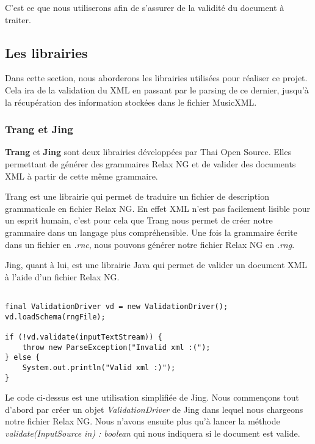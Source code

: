 \par
C'est ce que nous utiliserons afin de s'assurer de la validité du document à traiter.


\subsection{Les librairies}

Dans cette section, nous aborderons les librairies utilisées pour réaliser ce projet. Cela ira de la validation du XML en passant par le parsing de ce dernier, jusqu'à la récupération des information stockées dans le fichier MusicXML.


\subsubsection{Trang et Jing}

\textbf{Trang} \cite{trang} et \textbf{Jing} \cite{jing} sont deux librairies développées par Thai Open Source. Elles permettant de générer des grammaires Relax NG et de valider des documents XML à partir de cette même grammaire.

\par
Trang est une librairie qui permet de traduire un fichier de description grammaticale en fichier Relax NG. En effet XML n'est pas facilement lisible pour un esprit humain, c'est pour cela que Trang nous permet de créer notre grammaire dans un langage plus compréhensible. Une fois la grammaire écrite dans un fichier en \emph{.rnc}, nous pouvons générer notre fichier Relax NG en \emph{.rng}.

\par
Jing, quant à lui, est une librairie Java qui permet de valider un document XML à l'aide d'un fichier Relax NG.


\begin{lstlisting}[caption=Code java permettant de vérifier la validation d'un document XML]

final ValidationDriver vd = new ValidationDriver();
vd.loadSchema(rngFile);

if (!vd.validate(inputTextStream)) {
	throw new ParseException("Invalid xml :(");
} else {
    System.out.println("Valid xml :)");
}
\end{lstlisting}

\par
Le code ci-dessus est une utilisation simplifiée de Jing. Nous commençons tout d'abord par créer un objet \emph{ValidationDriver} de Jing dans lequel nous chargeons notre fichier Relax NG. Nous n'avons ensuite plus qu'à lancer la méthode \emph{validate(InputSource in) : boolean} qui nous indiquera si le document est valide.


